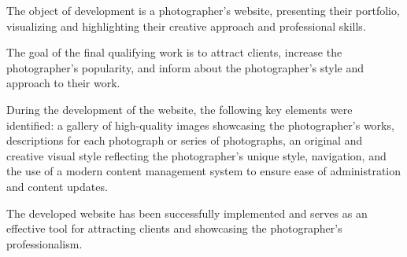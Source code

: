 The object of development is a photographer's website, presenting their portfolio, visualizing and highlighting their creative approach and professional skills.

The goal of the final qualifying work is to attract clients, increase the photographer's popularity, and inform about the photographer's style and approach to their work.

During the development of the website, the following key elements were identified: a gallery of high-quality images showcasing the photographer's works, descriptions for each photograph or series of photographs, an original and creative visual style reflecting the photographer's unique style, navigation, and the use of a modern content management system to ensure ease of administration and content updates.

The developed website has been successfully implemented and serves as an effective tool for attracting clients and showcasing the photographer's professionalism.
